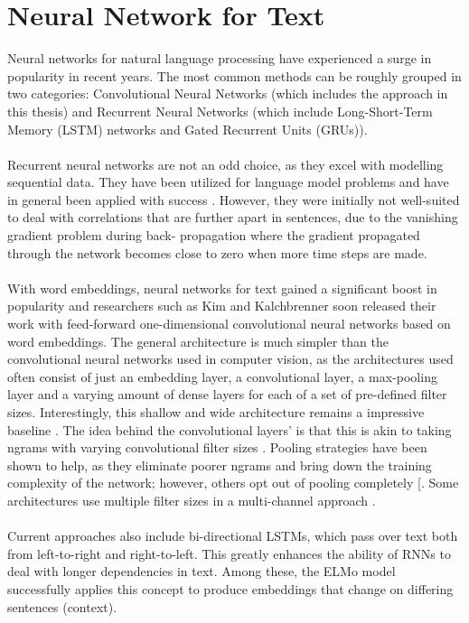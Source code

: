 \section{Neural Network for Text}
Neural networks for natural language processing have experienced a surge in popularity in recent years. The most common methods can be roughly grouped in two categories: Convolutional Neural Networks (which includes the approach in this thesis) and Recurrent Neural Networks (which include Long-Short-Term Memory (LSTM) networks and Gated Recurrent Units (GRUs)).\\
\\
Recurrent neural networks are not an odd choice, as they excel with modelling sequential data. They have been utilized for language model problems and have in general been applied with success \cite{Mikolov2010a, Chung2014, Lai2015, Howard2018, Xu}. However, they were initially not well-suited to deal with correlations that are further apart in sentences, due to the vanishing gradient problem during back- propagation where the gradient propagated through the network becomes close to zero when more time steps are made.\\ 
\\
With word embeddings, neural networks for text gained a significant boost in popularity and researchers such as Kim \cite{Kim2014} and Kalchbrenner\cite{Kalchbrenner2014} soon released their work with feed-forward one-dimensional convolutional neural networks based on word embeddings. The general architecture is much simpler than the convolutional neural networks used in computer vision, as the architectures used often consist of just an embedding layer, a convolutional layer, a max-pooling layer and a varying amount of dense layers for each of a set of pre-defined filter sizes. Interestingly, this shallow and wide architecture remains a impressive baseline \cite{Le2017}. The idea behind the convolutional layers’ is that this is akin to taking ngrams with varying convolutional filter sizes \cite{Zhang2015, Jacovi2018} . Pooling strategies have been shown to help, as they eliminate poorer ngrams and bring down the training complexity of the network; however, others opt out of pooling completely [\cite{Kim2014, Zhang2015}. Some architectures use multiple filter sizes in a multi-channel approach \cite{Kim2014,Liu2017,Goldberg2016}.\\
\\
Current approaches also include bi-directional LSTMs, which pass over text both from left-to-right \cite{Radford2018} and right-to-left. This greatly enhances the ability of RNNs to deal with longer dependencies in text. Among these, the ELMo model \cite{Peters2018} successfully applies this concept to produce embeddings that change on differing sentences (context).\\ 



